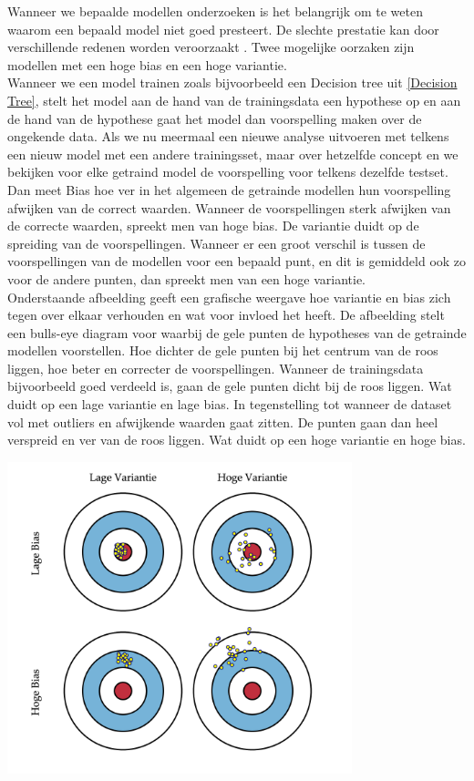 \begin{itemize}
Wanneer we bepaalde modellen onderzoeken is het belangrijk om te weten waarom een bepaald model niet goed presteert. De slechte prestatie kan door verschillende redenen worden veroorzaakt \cite{mitchell1997machine}. Twee mogelijke oorzaken zijn modellen met een hoge bias en een hoge variantie.\\
%
%
Wanneer we een model trainen zoals bijvoorbeeld een Decision tree uit \ref{Decision Tree}, stelt het model aan de hand van de trainingsdata een hypothese op en aan de hand van de hypothese gaat het model dan voorspelling maken over de ongekende data. Als we nu meermaal een nieuwe analyse uitvoeren met telkens een nieuw model met een andere trainingsset, maar over hetzelfde concept en we bekijken voor elke getraind model de voorspelling voor telkens dezelfde testset. Dan meet Bias hoe ver in het algemeen de getrainde modellen hun voorspelling afwijken van de correct waarden. Wanneer de voorspellingen sterk afwijken van de correcte waarden, spreekt men van hoge bias.  De variantie duidt op de spreiding van de voorspellingen. Wanneer er een groot verschil is tussen de voorspellingen van de modellen voor een bepaald punt, en dit is gemiddeld ook zo voor de andere punten, dan spreekt men van een hoge variantie.\\
%
Onderstaande afbeelding geeft een grafische weergave hoe variantie en bias zich tegen over elkaar verhouden en wat voor invloed het heeft.
De afbeelding stelt een bulls-eye diagram voor waarbij de gele punten de hypotheses van de getrainde modellen voorstellen. Hoe dichter de gele punten bij het centrum van de roos liggen, hoe beter en correcter de voorspellingen. Wanneer de trainingsdata bijvoorbeeld goed verdeeld is, gaan de gele punten dicht bij de roos liggen. Wat duidt op een lage variantie en lage bias. In tegenstelling tot wanneer de dataset vol met outliers en afwijkende waarden gaat zitten. De punten gaan dan heel verspreid en ver van de roos liggen. Wat duidt op een hoge variantie en hoge bias.\\
%
\begin{center}
  \includegraphics[width=10cm]{bulls-eye}
\end{center}


\end{itemize}
